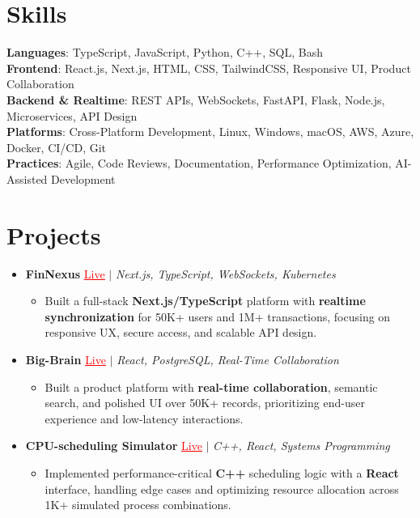 \documentclass[letterpaper,10pt]{article}
\newcommand{\resumeItem}[1]{\item\small{{#1 \vspace{-2pt}}}}
\newcommand{\resumeProjectHeading}[1]{\item \small #1 \vspace{-2pt}}
\newcommand{\resumeSubHeadingListStart}{\begin{itemize}[leftmargin=0.0in, label={}]}
\newcommand{\resumeSubHeadingListEnd}{\end{itemize}}
\newcommand{\resumeProjItemListStart}{\begin{itemize}[leftmargin=0.15in,label=\textbullet,itemsep=0pt,topsep=0pt,parsep=0pt,partopsep=0pt]}
\newcommand{\resumeProjItemListEnd}{\end{itemize}\vspace{-4pt}}
\begin{document}
\section{Skills}
\begin{itemize}[leftmargin=0.15in, label={}]
\small{\item{
\textbf{Languages}: TypeScript, JavaScript, Python, C++, SQL, Bash \\
\textbf{Frontend}: React.js, Next.js, HTML, CSS, TailwindCSS, Responsive UI, Product Collaboration \\
\textbf{Backend \& Realtime}: REST APIs, WebSockets, FastAPI, Flask, Node.js, Microservices, API Design \\
\textbf{Platforms}: Cross-Platform Development, Linux, Windows, macOS, AWS, Azure, Docker, CI/CD, Git \\
\textbf{Practices}: Agile, Code Reviews, Documentation, Performance Optimization, AI-Assisted Development
}}
\end{itemize}
\vspace{-6pt}
\section{Projects}
\resumeSubHeadingListStart
\vspace{-2pt}
\resumeProjectHeading{\textbf{FinNexus} {\href{https://fin-nexus.vercel.app/}{\textcolor{red}{\underline{Live}}}} $|$ \emph{Next.js, TypeScript, WebSockets, Kubernetes}}
\resumeProjItemListStart
\resumeItem{Built a full-stack \textbf{Next.js/TypeScript} platform with \textbf{realtime synchronization} for 50K+ users and 1M+ transactions, focusing on responsive UX, secure access, and scalable API design.}
\resumeProjItemListEnd
\vspace{3pt}
\resumeProjectHeading{\textbf{Big-Brain} {\href{https://big-brain-pied.vercel.app/}{\textcolor{red}{\underline{Live}}}} $|$ \emph{React, PostgreSQL, Real-Time Collaboration}}
\resumeProjItemListStart
\resumeItem{Built a product platform with \textbf{real-time collaboration}, semantic search, and polished UI over 50K+ records, prioritizing end-user experience and low-latency interactions.}
\resumeProjItemListEnd
\vspace{3pt}
\resumeProjectHeading{\textbf{CPU-scheduling Simulator} {\href{https://cpu-scheduler-amber.vercel.app/}{\textcolor{red}{\underline{Live}}}} $|$ \emph{C++, React, Systems Programming}}
\resumeProjItemListStart
\resumeItem{Implemented performance-critical \textbf{C++} scheduling logic with a \textbf{React} interface, handling edge cases and optimizing resource allocation across 1K+ simulated process combinations.}
\resumeProjItemListEnd
\resumeSubHeadingListEnd
\end{document}
